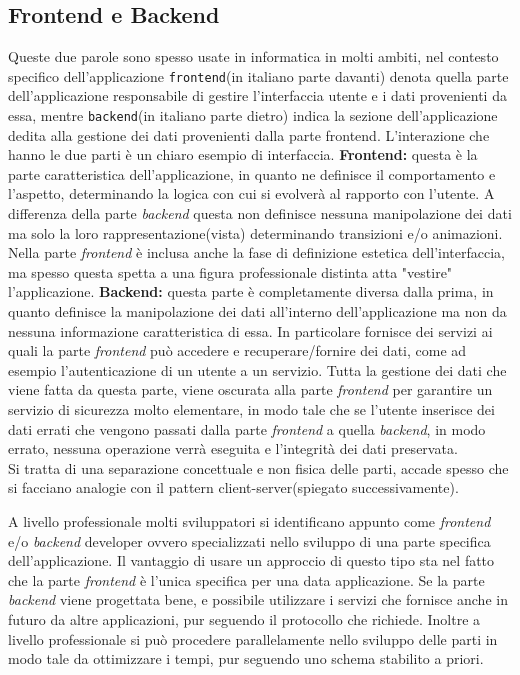 \subsection{Frontend e Backend}
Queste due parole sono spesso usate in informatica in molti ambiti, nel contesto specifico dell'applicazione \texttt{frontend}(in italiano parte davanti) denota quella parte dell'applicazione responsabile di gestire l'interfaccia utente e i dati provenienti da essa, mentre \texttt{backend}(in italiano parte dietro) indica la sezione dell'applicazione dedita alla gestione dei dati provenienti dalla parte frontend. L'interazione che hanno le due parti è un chiaro esempio di interfaccia.
\textbf{Frontend:} questa è la parte caratteristica dell'applicazione, in quanto ne definisce il comportamento e l'aspetto, determinando la logica con cui si evolverà al rapporto con l'utente. A differenza della parte \emph{backend} questa non definisce nessuna manipolazione dei dati ma solo la loro rappresentazione(vista) determinando transizioni e/o animazioni.
Nella parte \emph{frontend} è inclusa anche la fase di definizione estetica dell'interfaccia, ma spesso questa spetta a una figura professionale distinta atta "vestire" l'applicazione.
\textbf{Backend:} questa parte è completamente diversa dalla prima, in quanto definisce la manipolazione dei dati all'interno dell'applicazione ma non da nessuna informazione caratteristica di essa. In particolare fornisce dei servizi ai quali la parte \emph{frontend} può accedere e recuperare/fornire dei dati, come ad esempio l'autenticazione di un utente a un servizio. Tutta la gestione dei dati che viene fatta da questa parte, viene oscurata alla parte \emph{frontend} per garantire un servizio di sicurezza molto elementare, in modo tale che se l'utente inserisce dei dati errati che vengono passati dalla parte \emph{frontend} a quella \emph{backend}, in modo errato, nessuna operazione verrà eseguita e l'integrità dei dati preservata.\\

Si tratta di una separazione concettuale e non fisica delle parti, accade spesso che si facciano analogie con il pattern client-server(spiegato successivamente).

A livello professionale molti sviluppatori si identificano appunto come \emph{frontend} e/o \emph{backend} developer ovvero specializzati nello sviluppo di una parte specifica dell'applicazione. Il vantaggio di usare un approccio di questo tipo sta nel fatto che la parte \emph{frontend} è l'unica specifica per una data applicazione. Se la parte \emph{backend} viene progettata bene, e possibile utilizzare i servizi che fornisce anche in futuro da altre applicazioni, pur seguendo il protocollo che richiede. Inoltre a livello professionale si può procedere parallelamente nello sviluppo delle parti in modo tale da ottimizzare i tempi, pur seguendo uno schema stabilito a priori.\\


